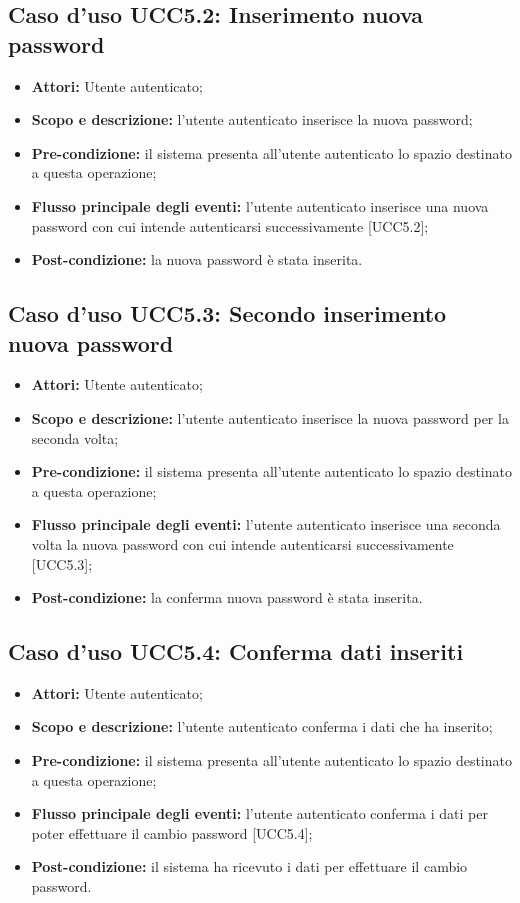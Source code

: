\subsection{Caso d'uso UCC5.2: Inserimento nuova password}

\begin{itemize}
\item \textbf{Attori:} Utente autenticato;
\item \textbf{Scopo e descrizione:} l'utente autenticato inserisce la nuova password;
\item \textbf{Pre-condizione:} il sistema presenta all'utente autenticato lo spazio destinato a questa operazione;
\item \textbf{Flusso principale degli eventi:} l'utente autenticato inserisce una nuova password con cui intende autenticarsi successivamente [UCC5.2];
\item \textbf{Post-condizione:} la nuova password è stata inserita.
\end{itemize}

\subsection{Caso d'uso UCC5.3: Secondo inserimento nuova password}

\begin{itemize}
\item \textbf{Attori:} Utente autenticato;
\item \textbf{Scopo e descrizione:} l'utente autenticato inserisce la nuova password per la seconda volta;
\item \textbf{Pre-condizione:} il sistema presenta all'utente autenticato lo spazio destinato a questa operazione;
\item \textbf{Flusso principale degli eventi:} l'utente autenticato inserisce una seconda volta la nuova password con cui intende autenticarsi successivamente [UCC5.3];
\item \textbf{Post-condizione:} la conferma nuova password è stata inserita.
\end{itemize}

\subsection{Caso d'uso UCC5.4: Conferma dati inseriti}

\begin{itemize}
\item \textbf{Attori:} Utente autenticato;
\item \textbf{Scopo e descrizione:} l'utente autenticato conferma i dati che ha inserito;
\item \textbf{Pre-condizione:} il sistema presenta all'utente autenticato lo spazio destinato a questa operazione;
\item \textbf{Flusso principale degli eventi:} l'utente autenticato conferma i dati per poter effettuare il cambio password [UCC5.4];
\item \textbf{Post-condizione:} il sistema ha ricevuto i dati per effettuare il cambio password.
\end{itemize}

